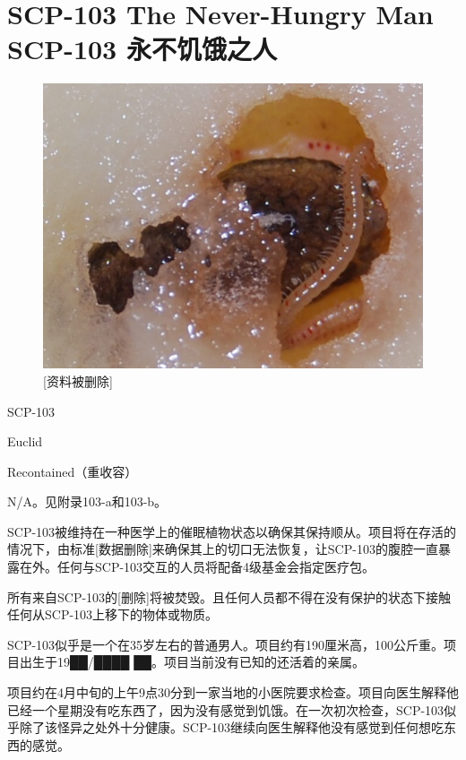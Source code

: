 \chapter[SCP-103 永不饥饿之人]{
    SCP-103 The Never-Hungry Man\\
    SCP-103 永不饥饿之人
}

\label{chap:SCP-103}

\begin{figure}[H]
    \centering
    \includegraphics[width=0.5\linewidth]{images/SCP-103.jpg}
    \caption*{{[}资料被删除]}
\end{figure}

SCP-103

Euclid

Recontained（重收容）


N\slash A。见附录103-a和103-b。

SCP-103被维持在一种医学上的催眠植物状态以确保其保持顺从。项目将在存活的情况下，由标准{[}数据删除]来确保其上的切口无法恢复，让SCP-103的腹腔一直暴露在外。任何与SCP-103交互的人员将配备4级基金会指定医疗包。

所有来自SCP-103的{[}删除]将被焚毁。且任何人员都不得在没有保护的状态下接触任何从SCP-103上移下的物体或物质。

SCP-103似乎是一个在35岁左右的普通男人。项目约有190厘米高，100公斤重。项目出生于19██\slash ████ ██。项目当前没有已知的还活着的亲属。

项目约在4月中旬的上午9点30分到一家当地的小医院要求检查。项目向医生解释他已经一个星期没有吃东西了，因为没有感觉到饥饿。在一次初次检查，SCP-103似乎除了该怪异之处外十分健康。SCP-103继续向医生解释他没有感觉到任何想吃东西的感觉。


